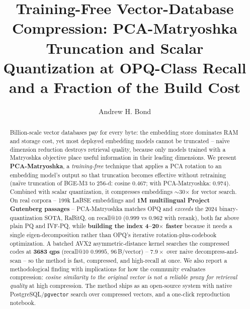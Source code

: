 \documentclass[sigconf, nonacm]{acmart}
\begin{document}
\title{Training-Free Vector-Database Compression: PCA-Matryoshka Truncation and
Scalar Quantization at OPQ-Class Recall and a Fraction of the Build Cost}

\author{Andrew H. Bond}

\begin{abstract}
Billion-scale vector databases pay for every byte: the embedding store dominates
RAM and storage cost, yet most deployed embedding models cannot be truncated --
na\"ive dimension reduction destroys retrieval quality, because only models
trained with a Matryoshka objective place useful information in their leading
dimensions. We present \textbf{PCA-Matryoshka}, a \emph{training-free} technique
that applies a PCA rotation to an embedding model's output so that truncation
becomes effective without retraining (na\"ive truncation of BGE-M3 to 256-d:
cosine $0.467$; with PCA-Matryoshka: $0.974$). Combined with scalar quantization,
it compresses embeddings $\sim$30$\times$ for vector search. On real corpora --
199k LaBSE embeddings and \textbf{1M multilingual Project Gutenberg passages} --
PCA-Matryoshka matches OPQ and \emph{exceeds} the 2024 binary-quantization SOTA,
RaBitQ, on recall@10 ($0.999$ vs $0.962$ with rerank), both far above plain PQ
and IVF-PQ, while
\textbf{building the index 4--20$\times$ faster} because it needs a single
eigen-decomposition rather than OPQ's iterative rotation-plus-codebook
optimization. A batched AVX2 asymmetric-distance kernel searches the compressed
codes at \textbf{3683 qps} (recall@10 $0.9995$, 96\,B/vector) -- $7.9\times$ over
naive decompress-and-scan -- so the method is fast, compressed, and high-recall at
once. We also report a methodological finding with implications for how
the community evaluates compression: \emph{cosine similarity to the original
vector is not a reliable proxy for retrieval quality} at high compression. The
method ships as an open-source system with native PostgreSQL/\texttt{pgvector}
search over compressed vectors, and a one-click reproduction notebook.
\end{abstract}


\maketitle
\end{document}
